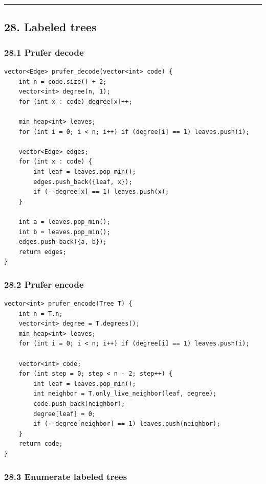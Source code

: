 \documentclass[11pt]{article}
\begin{document}
\begin{center}\rule{0.5\linewidth}{0.5pt}\end{center}

\subsection{28. Labeled trees}\label{labeled-trees}

\subsubsection{28.1 Prufer decode}\label{pruxfcfer-decode}

\begin{verbatim}
vector<Edge> prufer_decode(vector<int> code) {
    int n = code.size() + 2;
    vector<int> degree(n, 1);
    for (int x : code) degree[x]++;

    min_heap<int> leaves;
    for (int i = 0; i < n; i++) if (degree[i] == 1) leaves.push(i);

    vector<Edge> edges;
    for (int x : code) {
        int leaf = leaves.pop_min();
        edges.push_back({leaf, x});
        if (--degree[x] == 1) leaves.push(x);
    }

    int a = leaves.pop_min();
    int b = leaves.pop_min();
    edges.push_back({a, b});
    return edges;
}
\end{verbatim}

\subsubsection{28.2 Prufer encode}\label{pruxfcfer-encode}

\begin{verbatim}
vector<int> prufer_encode(Tree T) {
    int n = T.n;
    vector<int> degree = T.degrees();
    min_heap<int> leaves;
    for (int i = 0; i < n; i++) if (degree[i] == 1) leaves.push(i);

    vector<int> code;
    for (int step = 0; step < n - 2; step++) {
        int leaf = leaves.pop_min();
        int neighbor = T.only_live_neighbor(leaf, degree);
        code.push_back(neighbor);
        degree[leaf] = 0;
        if (--degree[neighbor] == 1) leaves.push(neighbor);
    }
    return code;
}
\end{verbatim}

\subsubsection{28.3 Enumerate labeled trees}\label{enumerate-labeled-trees}
\end{document}
